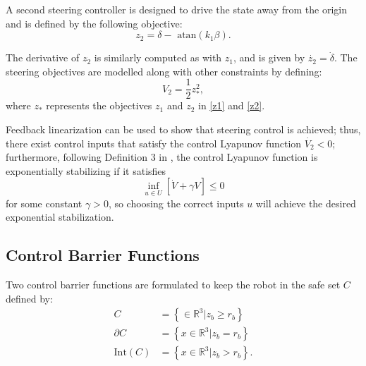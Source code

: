 \documentclass[conference]{IEEEtran}
\begin{document}
A second steering controller is designed to drive the state away from the origin and is defined by the following objective: \begin{equation}z_2=\delta-\text{ atan}(k_1\beta).\label{z2}\end{equation}

The derivative of $z_2$ is similarly computed as with $z_1$, and is given by $\dot{z_2} = \dot{\delta}.$ The steering objectives are modelled along with other constraints by defining: 
\begin{equation} V_2 = \frac{1}{2}  z_*^2, \label{v2}\end{equation}
where $z_*$ represents the objectives $z_1$ and $z_2$ in \eqref{z1} and \eqref{z2}.

Feedback linearization can be used to show that steering control is achieved; thus, there exist control inputs that satisfy the control Lyapunov function $\dot{V_2}<0$; furthermore, following Definition 3 in \cite{ames2014esclf}, the control Lyapunov function is exponentially stabilizing if it satisfies
\begin{equation}
\inf_{u\in U}\left[ \dot{V}+\gamma V \right] \leq 0
\label{eq:esclf}
\end{equation}
for some constant $\gamma >0$, so choosing the correct inputs $u$ will achieve the desired exponential stabilization. 


\subsection{Control Barrier Functions}
Two control barrier functions are formulated to keep the robot in the safe set $C$ defined by:
\begin{align}
C &= \left\lbrace \in \mathbb{R}^3 | z_b\geq r_b\right\rbrace\\
\partial C &= \left\lbrace x \in \mathbb{R}^3 | z_b=r_b\right\rbrace\\
\text{Int}(C) &= \left\lbrace x \in \mathbb{R}^3 | z_b > r_b\right\rbrace.
\end{align}
\end{document}
